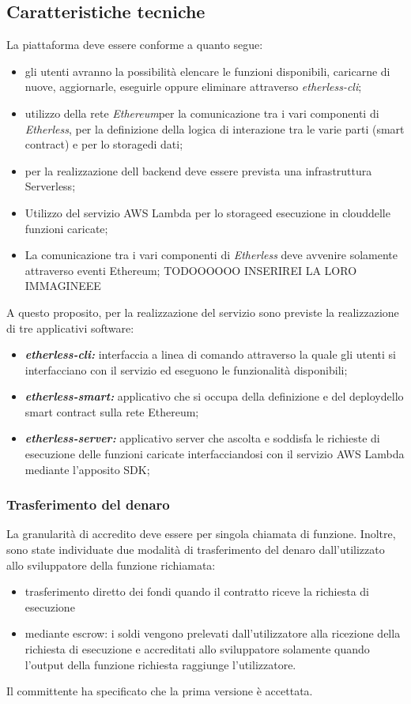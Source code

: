 \subsection{Caratteristiche tecniche}
La piattaforma deve essere conforme a quanto segue:
\begin{itemize}
	\item gli utenti avranno la possibilità elencare le funzioni disponibili,  caricarne di nuove, aggiornarle, eseguirle oppure eliminare attraverso \textit{etherless-cli};
	\item utilizzo della rete \textit{Ethereum}\glo per la comunicazione tra i vari componenti di \textit{Etherless}, per la definizione della logica di interazione tra le varie parti (smart contract\glo) e per lo storage\glo di dati;
	\item per la realizzazione dell backend deve essere prevista una infrastruttura Serverless\glo;
	\item Utilizzo del servizio AWS Lambda per lo storage\glo ed esecuzione in cloud\glo delle funzioni caricate;
	\item La comunicazione tra i vari componenti di \textit{Etherless} deve avvenire solamente attraverso eventi Ethereum\glo; TODOOOOOO INSERIREI LA LORO IMMAGINEEE

\end{itemize}
A questo proposito, per la realizzazione del servizio sono previste la realizzazione di tre applicativi software:
	\begin{itemize}
		\item \textbf{\textit{etherless-cli:}} interfaccia a linea di comando attraverso la quale gli utenti si interfacciano con il servizio ed eseguono le funzionalità disponibili;
		\item \textbf{\textit{etherless-smart:}} applicativo che si occupa della definizione e del deploy\glo dello smart contract sulla rete Ethereum;
		\item \textbf{\textit{etherless-server:}} applicativo server che ascolta e soddisfa le richieste di esecuzione delle funzioni caricate interfacciandosi con il servizio AWS Lambda mediante l'apposito SDK;
	\end{itemize}
\subsubsection{Trasferimento del denaro}
La granularità di accredito deve essere per singola chiamata di funzione. Inoltre, sono state individuate due modalità di trasferimento del denaro dall'utilizzato allo sviluppatore della funzione richiamata:
\begin{itemize}
	\item trasferimento diretto dei fondi quando il contratto riceve la richiesta di esecuzione
	\item mediante escrow: i soldi vengono prelevati dall'utilizzatore alla ricezione della richiesta di esecuzione e accreditati allo sviluppatore solamente quando l'output della funzione richiesta raggiunge l'utilizzatore.
\end{itemize}
Il committente ha specificato che la prima versione è accettata.

